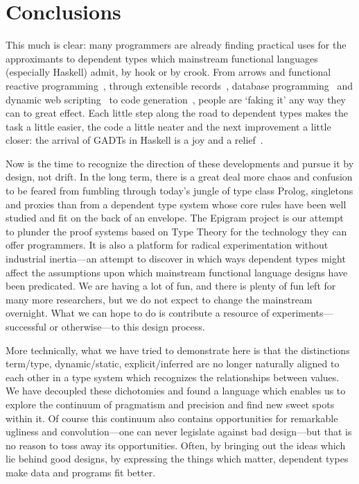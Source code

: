 \documentclass{fundam}
\begin{document}
\section{Conclusions}
\label{sec:concl}

This much is clear: many programmers are already finding practical
uses for the approximants to dependent types which mainstream
functional languages (especially Haskell) admit, by hook or by crook.
From arrows and functional reactive
programming~\cite{hughes:afp-arrows,henrik:dynamic-optimisation},
through extensible records~\cite{oleg.ralf.keean:hlists},
database programming~\cite{bringert.hockersten:haskellDB}  and
dynamic web scripting~\cite{thiemann:programmabletypes} to code
generation~\cite{baars.swierstra:selfinspecting}, people are `faking it'
any way they can to great effect.
Each little step along the road to dependent types makes the task
a little easier, the code a little neater and the next improvement a
little closer: the arrival of GADTs in Haskell is a joy and a
relief~\cite{peyton-jones-wobbly}.

Now is the time to recognize the direction of these developments and
pursue it by design, not drift. In the long term, there is a great
deal more chaos and confusion to be feared from fumbling through
today's jungle of type class Prolog, singletons and proxies than from
a dependent type system whose core rules have been well studied and
fit on the back of an envelope. The Epigram project is our attempt to
plunder the proof systems based on Type Theory for the technology they
can offer programmers. It is also a platform for radical
experimentation without industrial inertia---an attempt to discover in
which ways dependent types might affect the assumptions upon which
mainstream functional language designs have been predicated. We are
having a lot of fun, and there is plenty of fun left for many more
researchers, but we do not expect to change the mainstream
overnight. What we can hope to do is contribute a resource of
experiments---successful or otherwise---to this design process.

More technically, what we have tried to demonstrate here is that the
distinctions term/type, dynamic/static, explicit/inferred are no longer
naturally aligned to each other in a type system which recognizes the
relationships between values. We have decoupled these dichotomies and
found a language which enables us to explore the continuum of
pragmatism and precision and find new sweet spots within it.
Of course this continuum also contains opportunities for remarkable
ugliness and convolution---one can never legislate against bad design---but
that is no reason to toss away its opportunities. Often, by
bringing out the ideas which lie behind good designs, by expressing
the things which matter, dependent types make data and programs fit better.


 
\end{document}
